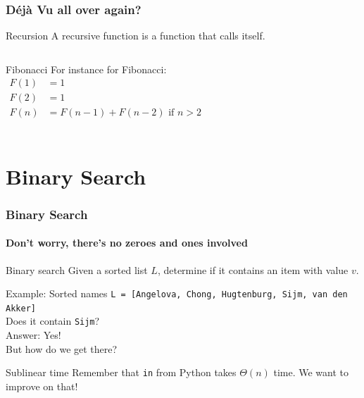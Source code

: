 \begin{frame}
	\frametitle{Déjà Vu all over again?}
	
		\begin{block}{Recursion}
			A recursive function is a function that calls itself.
		\end{block}	
		\pause
		\begin{columns}
			\begin{exampleblock}{Fibonacci}
				For instance for Fibonacci:
				\begin{align*}
					F(1) &= 1 \\
					F(2) &= 1 \\
					F(n) &= F(n-1) + F(n-2) \text{ if $n > 2$}\\
				\end{align*}
			\end{exampleblock}
			\pause
		
				
		\end{columns}
\end{frame}

\section{Binary Search}
\label{sec:binary_search}


\begin{frame}
	\frametitle{Binary Search}
	\framesubtitle{Don't worry, there's no zeroes and ones involved}

	\begin{problemblock}{Binary search}
		Given a sorted list $L$, determine if it contains an item with value $v$.
	\end{problemblock}
	\pause
	\begin{exampleblock}{Example: Sorted names}
		\texttt{L = [Angelova, Chong, Hugtenburg, Sijm, van den Akker]}\\
		Does it contain \texttt{Sijm}?\\
		Answer: Yes!\\
		\pause
		\alert{But how do we get there?}
	\end{exampleblock}
	\pause
		\begin{alertblock}{Sublinear time}
			Remember that \texttt{in} from Python takes $\Theta(n)$ time. We want to improve on that!
		\end{alertblock}	
\end{frame}

